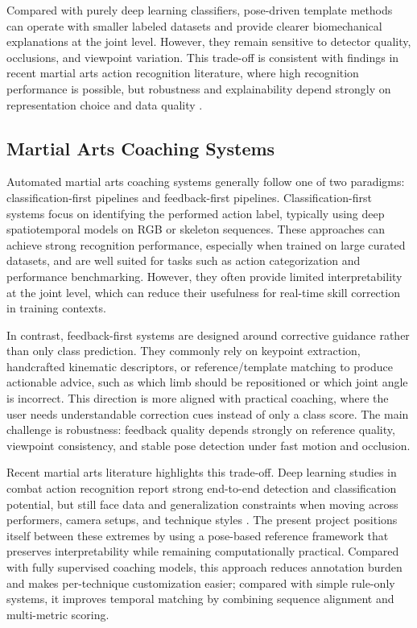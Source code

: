 \documentclass[12pt]{article}
\begin{document}
{Compared with purely deep learning classifiers, pose-driven template methods can operate with smaller labeled datasets and provide clearer biomechanical explanations at the joint level. However, they remain sensitive to detector quality, occlusions, and viewpoint variation. This trade-off is consistent with findings in recent martial arts action recognition literature, where high recognition performance is possible, but robustness and explainability depend strongly on representation choice and data quality \cite{martialartsDL2023,journalEQ2025}.

\subsection{Martial Arts Coaching Systems}
Automated martial arts coaching systems generally follow one of two paradigms: classification-first pipelines and feedback-first pipelines. Classification-first systems focus on identifying the performed action label, typically using deep spatiotemporal models on RGB or skeleton sequences. These approaches can achieve strong recognition performance, especially when trained on large curated datasets, and are well suited for tasks such as action categorization and performance benchmarking. However, they often provide limited interpretability at the joint level, which can reduce their usefulness for real-time skill correction in training contexts.

In contrast, feedback-first systems are designed around corrective guidance rather than only class prediction. They commonly rely on keypoint extraction, handcrafted kinematic descriptors, or reference/template matching to produce actionable advice, such as which limb should be repositioned or which joint angle is incorrect. This direction is more aligned with practical coaching, where the user needs understandable correction cues instead of only a class score. The main challenge is robustness: feedback quality depends strongly on reference quality, viewpoint consistency, and stable pose detection under fast motion and occlusion.

Recent martial arts literature highlights this trade-off. Deep learning studies in combat action recognition report strong end-to-end detection and classification potential, but still face data and generalization constraints when moving across performers, camera setups, and technique styles \cite{martialartsDL2023,journalEQ2025}. The present project positions itself between these extremes by using a pose-based reference framework that preserves interpretability while remaining computationally practical. Compared with fully supervised coaching models, this approach reduces annotation burden and makes per-technique customization easier; compared with simple rule-only systems, it improves temporal matching by combining sequence alignment and multi-metric scoring.

}
\end{document}
